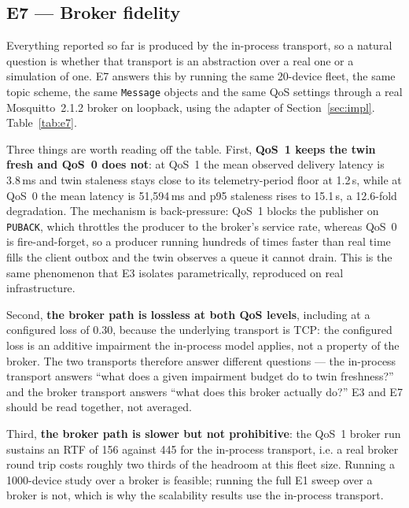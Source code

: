 \documentclass[preprint,12pt,authoryear,nopreprintline]{elsarticle}
\begin{document}

\subsection{E7 --- Broker fidelity}
\label{sec:eval-broker}
Everything reported so far is produced by the in-process transport, so a natural
question is whether that transport is an abstraction over a real one or a
simulation of one.
E7 answers this by running the same 20-device fleet, the same topic scheme, the
same \texttt{Message} objects and the same QoS settings through a real
Mosquitto~2.1.2 broker on loopback, using the adapter of
Section~\ref{sec:impl}.
Table~\ref{tab:e7}.

Three things are worth reading off the table.
First, \textbf{QoS~1 keeps the twin fresh and QoS~0 does not}: at QoS~1 the mean
observed delivery latency is 3.8\,ms and twin staleness stays close to its
telemetry-period floor at 1.2\,s, while at QoS~0 the mean latency is
51{,}594\,ms and p95 staleness rises to 15.1\,s, a 12.6-fold degradation.
The mechanism is back-pressure: QoS~1 blocks the publisher on \texttt{PUBACK},
which throttles the producer to the broker's service rate, whereas QoS~0 is
fire-and-forget, so a producer running hundreds of times faster than real time
fills the client outbox and the twin observes a queue it cannot drain.
This is the same phenomenon that E3 isolates parametrically, reproduced on real
infrastructure.

Second, \textbf{the broker path is lossless at both QoS levels}, including at a
configured loss of 0.30, because the underlying transport is TCP: the configured
loss is an additive impairment the in-process model applies, not a property of the
broker.
The two transports therefore answer different questions --- the in-process
transport answers ``what does a given impairment budget do to twin freshness?''
and the broker transport answers ``what does this broker actually do?''
E3 and E7 should be read together, not averaged.

Third, \textbf{the broker path is slower but not prohibitive}: the QoS~1 broker run
sustains an RTF of 156 against 445 for the in-process transport, i.e. a real broker
round trip costs roughly two thirds of the headroom at this fleet size.
Running a 1000-device study over a broker is feasible; running the full E1 sweep
over a broker is not, which is why the scalability results use the in-process
transport.


\end{document}
